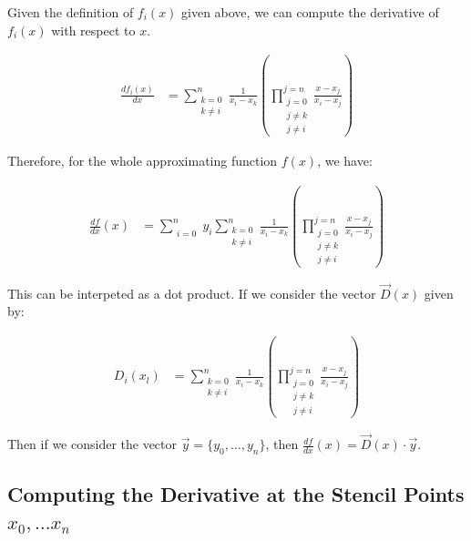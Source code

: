 \documentclass{article}
\begin{document}
Given the definition of $f_i(x)$ given above, we can compute
	the derivative of $f_i(x)$ with respect to $x$.

\begin{align}
\frac{d f_i(x)}{dx} & = \sum_{\begin{matrix}k=0\\k\neq i\end{matrix}}^n 
	\frac{1}{x_i - x_k}
	\left( \prod_{
		\begin{matrix} j = 0 \\ j \neq k\\j \neq i \end{matrix}}^{j=n}
		\frac{x - x_j}{x_i - x_j} \right)
\end{align}

Therefore, for the whole approximating function $f(x)$, we have:

\begin{align}
\frac{df}{dx}(x) & = \sum_{\begin{matrix}i=0\end{matrix}}^n
	y_i
	\sum_{\begin{matrix}k=0\\k\neq i\end{matrix}}^n
	\frac{1}{x_i - x_k}
	\left( \prod_{
		\begin{matrix} j = 0 \\ j \neq k\\j \neq i \end{matrix}}^{j=n}
		\frac{x - x_j}{x_i - x_j} \right)
\end{align}

This can be interpeted as a dot product.
If we consider the vector $\vec{D}(x)$ given by:

\begin{align}
D_i(x_l) & = 
	\sum_{\begin{matrix}k=0\\k\neq i\end{matrix}}^n
	\frac{1}{x_i - x_k}
	\left( \prod_{
		\begin{matrix} j = 0 \\ j \neq k\\j \neq i \end{matrix}}^{j=n}
		\frac{x - x_j}{x_i - x_j} \right)
\end{align}

Then if we consider the vector $\vec{y} = \{ y_0, \dots, y_n \}$,
	then $\frac{df}{dx}(x) = \vec{D}(x) \cdot \vec{y}$.

\subsection{Computing the Derivative at the Stencil Points $x_0, \dots x_n$}
  
\end{document}
